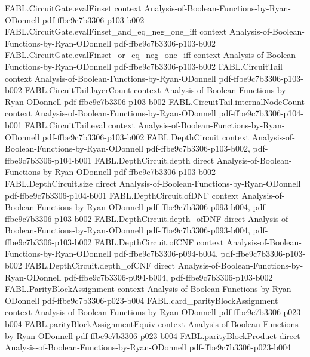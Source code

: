 \begin{theorem}
\proofstep
  {FABL.CircuitGate.evalFinset}
  {context}
  {Analysis-of-Boolean-Functions-by-Ryan-ODonnell}
  {pdf-ffbe9c7b3306-p103-b002}
\proofstep
  {FABL.CircuitGate.evalFinset_and_eq_neg_one_iff}
  {context}
  {Analysis-of-Boolean-Functions-by-Ryan-ODonnell}
  {pdf-ffbe9c7b3306-p103-b002}
\proofstep
  {FABL.CircuitGate.evalFinset_or_eq_neg_one_iff}
  {context}
  {Analysis-of-Boolean-Functions-by-Ryan-ODonnell}
  {pdf-ffbe9c7b3306-p103-b002}
\proofstep
  {FABL.CircuitTail}
  {context}
  {Analysis-of-Boolean-Functions-by-Ryan-ODonnell}
  {pdf-ffbe9c7b3306-p103-b002}
\proofstep
  {FABL.CircuitTail.layerCount}
  {context}
  {Analysis-of-Boolean-Functions-by-Ryan-ODonnell}
  {pdf-ffbe9c7b3306-p103-b002}
\proofstep
  {FABL.CircuitTail.internalNodeCount}
  {context}
  {Analysis-of-Boolean-Functions-by-Ryan-ODonnell}
  {pdf-ffbe9c7b3306-p104-b001}
\proofstep
  {FABL.CircuitTail.eval}
  {context}
  {Analysis-of-Boolean-Functions-by-Ryan-ODonnell}
  {pdf-ffbe9c7b3306-p103-b002}
\proofstep
  {FABL.DepthCircuit}
  {context}
  {Analysis-of-Boolean-Functions-by-Ryan-ODonnell}
  {pdf-ffbe9c7b3306-p103-b002,
    pdf-ffbe9c7b3306-p104-b001}
\proofstep
  {FABL.DepthCircuit.depth}
  {direct}
  {Analysis-of-Boolean-Functions-by-Ryan-ODonnell}
  {pdf-ffbe9c7b3306-p103-b002}
\proofstep
  {FABL.DepthCircuit.size}
  {direct}
  {Analysis-of-Boolean-Functions-by-Ryan-ODonnell}
  {pdf-ffbe9c7b3306-p104-b001}
\proofstep
  {FABL.DepthCircuit.ofDNF}
  {context}
  {Analysis-of-Boolean-Functions-by-Ryan-ODonnell}
  {pdf-ffbe9c7b3306-p093-b004,
    pdf-ffbe9c7b3306-p103-b002}
\proofstep
  {FABL.DepthCircuit.depth_ofDNF}
  {direct}
  {Analysis-of-Boolean-Functions-by-Ryan-ODonnell}
  {pdf-ffbe9c7b3306-p093-b004,
    pdf-ffbe9c7b3306-p103-b002}
\proofstep
  {FABL.DepthCircuit.ofCNF}
  {context}
  {Analysis-of-Boolean-Functions-by-Ryan-ODonnell}
  {pdf-ffbe9c7b3306-p094-b004,
    pdf-ffbe9c7b3306-p103-b002}
\proofstep
  {FABL.DepthCircuit.depth_ofCNF}
  {direct}
  {Analysis-of-Boolean-Functions-by-Ryan-ODonnell}
  {pdf-ffbe9c7b3306-p094-b004,
    pdf-ffbe9c7b3306-p103-b002}
\proofstep
  {FABL.ParityBlockAssignment}
  {context}
  {Analysis-of-Boolean-Functions-by-Ryan-ODonnell}
  {pdf-ffbe9c7b3306-p023-b004}
\proofstep
  {FABL.card_parityBlockAssignment}
  {context}
  {Analysis-of-Boolean-Functions-by-Ryan-ODonnell}
  {pdf-ffbe9c7b3306-p023-b004}
\proofstep
  {FABL.parityBlockAssignmentEquiv}
  {context}
  {Analysis-of-Boolean-Functions-by-Ryan-ODonnell}
  {pdf-ffbe9c7b3306-p023-b004}
\proofstep
  {FABL.parityBlockProduct}
  {direct}
  {Analysis-of-Boolean-Functions-by-Ryan-ODonnell}
  {pdf-ffbe9c7b3306-p023-b004}

\end{theorem}

